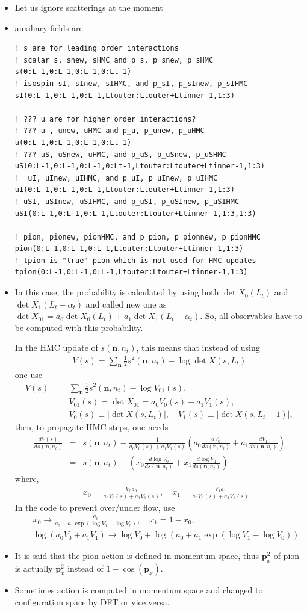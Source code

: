 \documentclass[10pt]{book}
\def\bm{\boldsymbol}
\newcommand{\bea}{\begin{eqnarray}}
\newcommand{\eea}{\end{eqnarray}}
\newcommand{\no}{\nonumber \\}
\def\vn{{\bm n}}
\def\vp{{\bm p}}
\begin{document}
\begin{itemize} 
\item Let us ignore scatterings at the moment
\item auxiliary fields are 
\begin{lstlisting}[frame=single]
! s are for leading order interactions
! scalar s, snew, sHMC and p_s, p_snew, p_sHMC
s(0:L-1,0:L-1,0:L-1,0:Lt-1) 
! isospin sI, sInew, sIHMC, and p_sI, p_sInew, p_sIHMC
sI(0:L-1,0:L-1,0:L-1,Ltouter:Ltouter+Ltinner-1,1:3)

! ??? u are for higher order interactions? 
! ??? u , unew, uHMC and p_u, p_unew, p_uHMC
u(0:L-1,0:L-1,0:L-1,0:Lt-1)
! ??? uS, uSnew, uHMC, and p_uS, p_uSnew, p_uSHMC
uS(0:L-1,0:L-1,0:L-1,0:Lt-1,Ltouter:Ltouter+Ltinner-1,1:3)
!  uI, uInew, uIHMC, and p_uI, p_uInew, p_uIHMC
uI(0:L-1,0:L-1,0:L-1,Ltouter:Ltouter+Ltinner-1,1:3)
! uSI, uSInew, uSIHMC, and p_uSI, p_uSInew, p_uSIHMC
uSI(0:L-1,0:L-1,0:L-1,Ltouter:Ltouter+Ltinner-1,1:3,1:3)

! pion, pionew, pionHMC, and p_pion, p_pionnew, p_pionHMC
pion(0:L-1,0:L-1,0:L-1,Ltouter:Ltouter+Ltinner-1,1:3)
! tpion is "true" pion which is not used for HMC updates 
tpion(0:L-1,0:L-1,0:L-1,Ltouter:Ltouter+Ltinner-1,1:3)
\end{lstlisting}  
\item In this case, the probability is calculated by using 
  both $\det X_0(L_t)$ and $\det X_1(L_t-\alpha_t)$ and called new one as
  $\det X_{01}=a_0 \det X_0(L_t)+ a_1 \det X_1(L_t-\alpha_t)$. So, all observables
  have to be computed with this probability.
  
  In the HMC update of $s(\vn,n_t)$, this means that instead of using 
  \bea 
  V(s)=\sum_{\vn}\frac{1}{2}s^2(\vn,n_t)-\log\det X(s,L_t)
  \eea 
  one use
  \bea 
  V(s)&=&\sum_{\vn}\frac{1}{2}s^2(\vn,n_t)-\log V_{01}(s),\no 
  & & V_{01}(s)=\det X_{01} = a_0 V_0(s) +a_1 V_1(s),\no 
  & &V_0(s)\equiv |\det X(s,L_t)|,\quad  V_1(s)\equiv |\det X(s,L_t-1)|,
  \eea 
  then, to propagate HMC steps, one needs
  \bea 
  \frac{d V(s)}{d s(\vn,n_t)}&=&
    s(\vn,n_t)-\frac{1}{a_0 V_0(s)+a_1 V_1(s)}\left(a_0\frac{d V_0}{d s(\vn,n_t)}
    +a_1\frac{d V_1}{d s(\vn,n_t)}
  \right)  \no 
   &=&s(\vn,n_t)-\left(  x_0 \frac{d \log V_0}{d s(\vn,n_t)}
   +x_1 \frac{d \log V_1}{d s(\vn,n_t)}\right)
  \eea 
  where,
  \bea 
   & & x_0=\frac{V_0 a_0}{a_0 V_0(s)+a_1 V_1(s)},\quad    x_1=\frac{V_1 a_1}{a_0 V_0(s)+a_1 V_1(s)}
  \eea 
  In the code to prevent over/under flow, use
  \bea 
  & &x_0\to \frac{a_0}{a_0+a_1 \exp(\log V_1 -\log V_0) }, \quad x_1=1-x_0 ,\no 
  & &\log(a_0 V_0+a_1 V_1)\to \log V_0 +\log (a_0+a_1\exp(\log V_1-\log V_0))
  \eea 
  
  
\item It is said that the pion action is defined in momentum space, 
      thus $\vp^2_x$ of pion is actually $\vp_x^2$ instead of $1-\cos(\vp_x)$.
\item Sometimes action is computed in momentum space and 
      changed to configuration space by DFT 
      or vice versa.   
\end{itemize}
\end{document}
